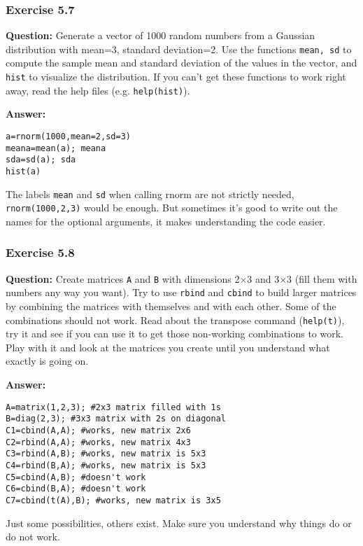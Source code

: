 \documentclass [11pt]{article}
\newcommand{\code}[1]{{\tt #1}}
\begin{document}
\subsubsection*{Exercise 5.7}
\textbf{Question:} Generate a vector of 1000 random numbers from a Gaussian distribution
with mean=3, standard deviation=2. Use the functions \texttt{mean, sd} to compute
the sample mean and standard deviation of the values in the vector, and \texttt{hist}
to visualize the distribution. If you can't get these functions to work right away, read the help files (e.g. \code{help(hist)}).

\textbf{Answer:}
\begin{verbatim}
a=rnorm(1000,mean=2,sd=3) 
meana=mean(a); meana
sda=sd(a); sda
hist(a)
\end{verbatim}
The labels \code{mean} and \code{sd} when calling rnorm are not strictly needed, \code{rnorm(1000,2,3)} would be enough. But sometimes it's good to write out the names for the optional arguments, it makes understanding the code easier.

\subsubsection*{Exercise 5.8}
\textbf{Question:} Create matrices \code{A} and \code{B} with dimensions 2$\times$3 and 3$\times$3 (fill them with numbers any way you want). 
Try to use \code{rbind} and \code{cbind} to build larger matrices by combining the matrices with themselves and with each other. 
Some of the combinations should not work. Read about the transpose command (\code{help(t)}), try it and see if you can use it to get those non-working combinations to work. Play with it and look at the matrices you create until you understand what exactly is going on. 

\textbf{Answer:}
\begin{verbatim}
A=matrix(1,2,3); #2x3 matrix filled with 1s
B=diag(2,3); #3x3 matrix with 2s on diagonal
C1=cbind(A,A); #works, new matrix 2x6
C2=rbind(A,A); #works, new matrix 4x3
C3=rbind(A,B); #works, new matrix is 5x3
C4=rbind(B,A); #works, new matrix is 5x3
C5=cbind(A,B); #doesn't work
C6=cbind(B,A); #doesn't work
C7=cbind(t(A),B); #works, new matrix is 3x5
\end{verbatim}
Just some possibilities, others exist. Make sure you understand why things do or do not work.
\end{document}
